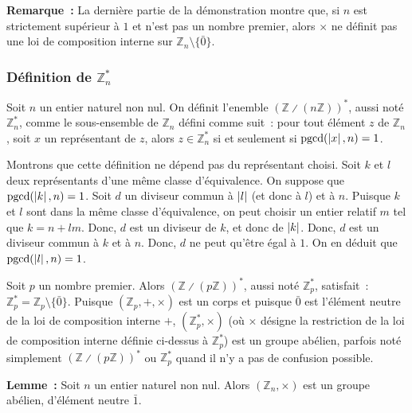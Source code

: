 \medskip

\noindent\textbf{Remarque :} La dernière partie de la démonstration montre que, si $n$ est strictement supérieur à $1$ et n'est pas un nombre premier, alors $\times$ ne définit pas une loi de composition interne sur $\mathbb{Z}_n \setminus \lbrace \bar{0} \rbrace$.

\subsubsection{Définition de \texorpdfstring{$\mathbb{Z}_n^*$}{Zn*}}

Soit $n$ un entier naturel non nul. 
On définit l'enemble $\left( \mathbb{Z} \divslash (n \mathbb{Z}) \right)^*$, aussi noté $\mathbb{Z}_n^*$, comme le sous-ensemble de $\mathbb{Z}_n$ défini comme suit : pour tout élément $z$ de $\mathbb{Z}_n$, soit $x$ un représentant de $z$, alors $z \in \mathbb{Z}_n^*$ si et seulement si $\mathrm{pgcd}(\left\lvert x \right\rvert, n) = 1$.

Montrons que cette définition ne dépend pas du représentant choisi. 
Soit $k$ et $l$ deux représentants d'une même classe d'équivalence. 
On suppose que $\mathrm{pgcd}(\left\lvert k \right\rvert, n) = 1$.
Soit $d$ un diviseur commun à $\left\lvert l \right\rvert$ (et donc à $l$) et à $n$. 
Puisque $k$ et $l$ sont dans la même classe d'équivalence, on peut choisir un entier relatif $m$ tel que $k = n + l m$.
Donc, $d$ est un diviseur de $k$, et donc de $\left\lvert k \right\rvert$. 
Donc, $d$ est un diviseur commun à $k$ et à $n$. 
Donc, $d$ ne peut qu'être égal à $1$.
On en déduit que $\mathrm{pgcd}(\left\lvert l \right\rvert, n) = 1$.

Soit $p$ un nombre premier. 
Alors $\left( \mathbb{Z} \divslash (p \mathbb{Z}) \right)^*$, aussi noté $\mathbb{Z}_p^*$, satisfait : $\mathbb{Z}_p^* = \mathbb{Z}_p \setminus \lbrace \bar{0} \rbrace$.
Puisque $\left(\mathbb{Z}_p, +, \times \right)$ est un corps et puisque $\bar{0}$ est l'élément neutre de la loi de composition interne $+$, $\left( \mathbb{Z}_p^*, \times \right)$ (où $\times$ désigne la restriction de la loi de composition interne définie ci-dessus à $\mathbb{Z}_p^*$) est un groupe abélien, parfois noté simplement $\left( \mathbb{Z} \divslash (p \mathbb{Z}) \right)^*$ ou $\mathbb{Z}_p^*$ quand il n'y a pas de confusion possible.

\medskip

\noindent
\textbf{Lemme :} Soit $n$ un entier naturel non nul. Alors $\left( \mathbb{Z}_n, \times \right)$ est un groupe abélien, d'élément neutre $\bar{1}$.

\medskip


